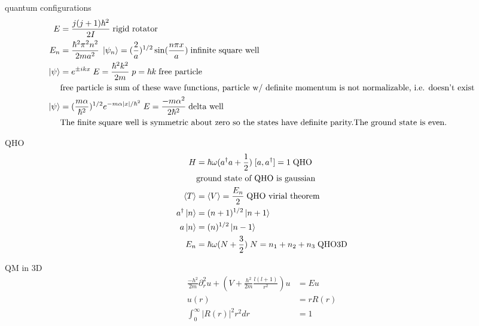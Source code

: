 \documentclass[avery5388, frame]{flashcards}
\begin{document}
\begin{flashcard}{quantum configurations}
  {
    \begin{align*}
      E &= \frac{j(j + 1)\hbar^{2}}{2 I} \; \textrm{rigid rotator}\\
      E_{n} &= \frac{\hbar^{2} \pi^{2} n^{2}}{2 m a^{2}} \; \ket{\psi_{n}} = (\frac{2}{a})^{1/2} \sin(\frac{n \pi x}{a}) \; \textrm{infinite square well}\\
      \ket{\psi} &= e^{\pm i k x} \; E = \frac{\hbar^{2} k^{2}}{2 m} \; p = \hbar k \; \textrm{free particle}\\
      &\textrm{free particle is sum of these wave functions, particle w/ definite momentum is not normalizable, i.e. doesn't exist}\\
      \ket{\psi} &= (\frac{m \alpha}{\hbar^{2}})^{1/2} e^{-m \alpha \lvert x \rvert / \hbar^{2}} \; E = \frac{-m \alpha^{2}}{2 \hbar^{2}} \; \textrm{delta well}\\
      &\textrm{The finite square well is symmetric about zero so the states have definite parity.The ground state is even.}\\
    \end{align*}
  }
\end{flashcard}

\begin{flashcard}{QHO}
  {
    \begin{align*}
      H &= \hbar \omega (a^{\dagger}a + \frac{1}{2}) \; [a, a^{\dagger}] = 1 \; \textrm{QHO}\\
      &\textrm{ground state of QHO is gaussian}\\
      \langle T \rangle &= \langle V \rangle = \frac{E_{n}}{2} \; \textrm{QHO virial theorem}\\
      a^{\dagger} \ket{n} &= (n + 1)^{1/2} \ket{n + 1}\\
      a \ket{n} &= (n)^{1/2} \ket{n - 1}\\
      E_{n} &= \hbar \omega (N + \frac{3}{2}) \; N = n_{1} + n_{2} + n_{3} \; \textrm{QHO3D}
    \end{align*}
  }
\end{flashcard}

\begin{flashcard}{QM in 3D}
  {
    \begin{align*}
      \frac{-h^{2}}{2m} \partial_{r}^{2} u + (V + \frac{h^{2}}{2m} \frac{l(l+1)}{r^{2}}) u &= E u\\
      u(r) &= r R(r)\\
      \int_{0}^{\infty} {\lvert R(r) \rvert}^{2} r^{2} dr &= 1
    \end{align*}
  }
\end{flashcard}
\end{document}
